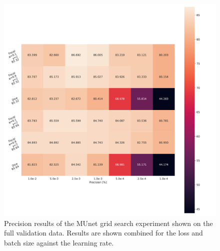 \begin{figure}[H]
\begin{center}
    \includegraphics[width=\columnwidth]{imgs/munet_grid_heat_P_B.pdf}
    \caption{Precision results of the \ac{MUnet} grid search experiment shown on the full validation data. Results are shown combined for the loss and batch size against the learning rate.}
    \label{fig:munet_pb_heat}
\end{center}
\end{figure}

